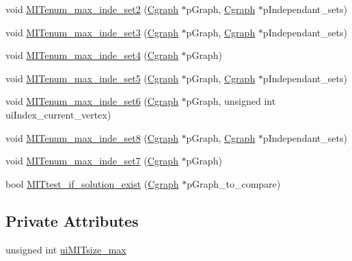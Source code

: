 \begin{DoxyCompactItemize}
void \hyperlink{class_cmax__inde__sets__table_ac1ea1bfbfe3c4dfdef3e966529f88c1f}{M\+I\+Tenum\+\_\+max\+\_\+inde\+\_\+set2} (\hyperlink{class_cgraph}{Cgraph} $\ast$p\+Graph, \hyperlink{class_cgraph}{Cgraph} $\ast$p\+Independant\+\_\+sets)
\item 
void \hyperlink{class_cmax__inde__sets__table_a4443b25faed663d6f2011d41edc30594}{M\+I\+Tenum\+\_\+max\+\_\+inde\+\_\+set3} (\hyperlink{class_cgraph}{Cgraph} $\ast$p\+Graph, \hyperlink{class_cgraph}{Cgraph} $\ast$p\+Independant\+\_\+sets)
\item 
void \hyperlink{class_cmax__inde__sets__table_ac97e4ba5939dd8a72c737ea4416997e2}{M\+I\+Tenum\+\_\+max\+\_\+inde\+\_\+set4} (\hyperlink{class_cgraph}{Cgraph} $\ast$p\+Graph)
\item 
void \hyperlink{class_cmax__inde__sets__table_a9365aa1408c211a8514e6a08c356c875}{M\+I\+Tenum\+\_\+max\+\_\+inde\+\_\+set5} (\hyperlink{class_cgraph}{Cgraph} $\ast$p\+Graph, \hyperlink{class_cgraph}{Cgraph} $\ast$p\+Independant\+\_\+sets)
\item 
void \hyperlink{class_cmax__inde__sets__table_a4945d82e35a9349f3299cf052e8454b1}{M\+I\+Tenum\+\_\+max\+\_\+inde\+\_\+set6} (\hyperlink{class_cgraph}{Cgraph} $\ast$p\+Graph, unsigned int ui\+Index\+\_\+current\+\_\+vertex)
\item 
void \hyperlink{class_cmax__inde__sets__table_ad02bc25918d717f721f9529836fa3a0a}{M\+I\+Tenum\+\_\+max\+\_\+inde\+\_\+set8} (\hyperlink{class_cgraph}{Cgraph} $\ast$p\+Graph, \hyperlink{class_cgraph}{Cgraph} $\ast$p\+Independant\+\_\+sets)
\item 
void \hyperlink{class_cmax__inde__sets__table_a0b912e6d883733b155f9c7064d8944a6}{M\+I\+Tenum\+\_\+max\+\_\+inde\+\_\+set7} (\hyperlink{class_cgraph}{Cgraph} $\ast$p\+Graph)
\item 
bool \hyperlink{class_cmax__inde__sets__table_ad6debe47c6f898406574908a34be3cc0}{M\+I\+Ttest\+\_\+if\+\_\+solution\+\_\+exist} (\hyperlink{class_cgraph}{Cgraph} $\ast$p\+Graph\+\_\+to\+\_\+compare)
\end{DoxyCompactItemize}
\subsection*{Private Attributes}
\begin{DoxyCompactItemize}
\item 
unsigned int \hyperlink{class_cmax__inde__sets__table_a9a847269f6dfaca3ce1c292fc31171cf}{ui\+M\+I\+Tsize\+\_\+max}
\end{DoxyCompactItemize}


